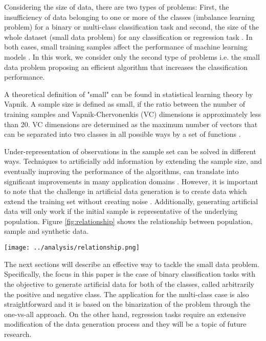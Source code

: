 Considering the size of data, there are two types of problems: First, the insufficiency of data belonging to one or more of the classes (imbalance learning problem) for a binary or multi-class classification task and second, the size of the whole dataset (small data problem) for any classification or regression task \cite{Sezer.2014}. In both cases, small training samples affect the performance of machine learning models \cite{Tsai.2008}. In this work, we consider only the second type of problems i.e. the small data problem proposing an efficient algorithm that increases the classification performance.

A theoretical definition of "small" can be found in statistical learning theory by Vapnik. A sample size is defined as small, if the ratio between the number of training samples and Vapnik-Chervonenkis (VC) dimensions is approximately less than 20. VC dimensions are determined as the maximum number of vectors that can be separated into two classes in all possible ways by a set of functions \cite{Vapnik.2008}.

Under-representation of observations in the sample set can be solved in different ways. Techniques to artificially add information by extending the sample size, and eventually improving the performance of the algorithms, can translate into significant improvements in many application domains \cite{Sezer.2014}. However, it is important to note that the challenge in artificial data generation is to create data which extend the training set without creating noise \cite{Li.2006}. Additionally, generating artificial data will only work if the initial sample is representative of the underlying population. Figure \ref{fig:relationship} shows the relationship between population, sample and synthetic data.

\begin{figure*}
	\centering
	\texttt{[image: ../analysis/relationship.png]}
	\caption{Relationship between population, sample and synthetic data \cite{Li.2006}.}
	\label{fig:relationship}
\end{figure*}

The next sections will describe an effective way to tackle the small data
problem. Specifically, the focus in this paper is the case of binary classification tasks with the objective to generate artificial data for both of the classes, called arbitrarily the positive and negative class. The application for the multi-class case is also straightforward and it is based on the binarization of the problem through the one-vs-all approach. On the other hand, regression tasks require an extensive modification of the data generation process and they will be a topic of future research. 

